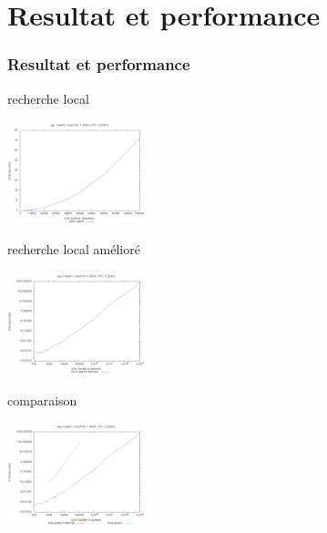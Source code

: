 \documentclass[10pt,a4paper]{beamer}
\begin{document}
\section{Resultat et performance}
\begin{frame}
	\frametitle{Resultat et performance}

	\begin{block}{recherche local}

	\includegraphics[width=0.3\textwidth]{images/plot_ls_i7.png}

	\end{block}

	\begin{block}{recherche local amélioré}

	\includegraphics[width=0.3\textwidth]{images/plot_lst_i7.png}

	\end{block}

	\begin{block}{comparaison}

	\includegraphics[width=0.3\textwidth]{images/plot_lst_ls_i7.png}

	\end{block}



\end{frame}
\end{document}

